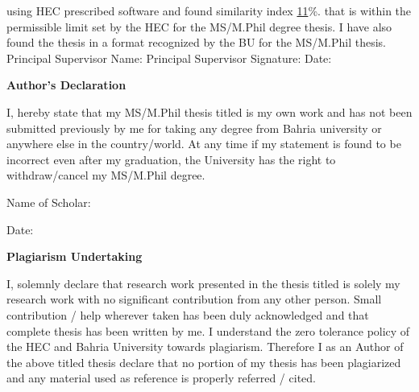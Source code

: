 using HEC prescribed software and found similarity index \underline{11}\%.
that is within the permissible limit set by the HEC for the MS/M.Phil degree thesis. I have also found the thesis in a format recognized by the BU for the MS/M.Phil thesis. 
\newline \newline
Principal Supervisor Name:  \SupervisorName
\newline
Principal Supervisor Signature: 
\newline 
Date: 

\newpage
{}
\begin{center}
	\large \textbf{Author's Declaration}
\end{center}
\vskip 0.45in
I, \underline{\AuthorName} hereby state that my MS/M.Phil thesis titled is my own work and has not been submitted previously by me for taking any degree from Bahria university or anywhere else in the country/world. At any time if my statement is found to be incorrect even after my graduation, the University has the right to
withdraw/cancel my MS/M.Phil degree.


\vskip 0.2in

\hspace{50mm}Name of Scholar: \AuthorName

\vskip 0.1in

\hspace{50mm}Date:

\newpage
{}
\begin{center}
	\large \textbf{Plagiarism Undertaking}
\end{center}
\vskip 0.45in
I, solemnly declare that research work presented in the thesis titled  \textit{\textbf{\ThesisTitle}} is solely my research work with no significant contribution from any other person. Small contribution / help wherever taken has been duly acknowledged and that complete thesis has been written by me. I understand the zero tolerance policy of the HEC and Bahria University towards plagiarism. Therefore I as an Author of the above titled thesis declare that no portion of my thesis has been plagiarized and any material used as reference is properly referred / cited.

